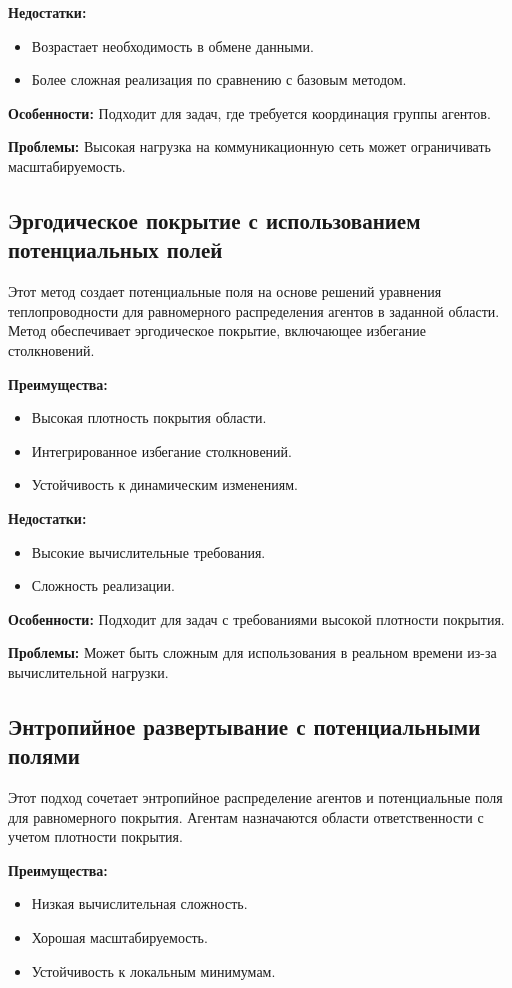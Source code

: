 \textbf{Недостатки:}
\begin{itemize}
	\item Возрастает необходимость в обмене данными.
	\item Более сложная реализация по сравнению с базовым методом.
\end{itemize}

\textbf{Особенности:} Подходит для задач, где требуется координация группы агентов.

\textbf{Проблемы:} Высокая нагрузка на коммуникационную сеть может ограничивать масштабируемость.

\subsection{Эргодическое покрытие с использованием потенциальных полей}
Этот метод создает потенциальные поля на основе решений уравнения теплопроводности для равномерного распределения агентов в заданной области. Метод обеспечивает эргодическое покрытие, включающее избегание столкновений.

\textbf{Преимущества:}
\begin{itemize}
	\item Высокая плотность покрытия области.
	\item Интегрированное избегание столкновений.
	\item Устойчивость к динамическим изменениям.
\end{itemize}

\textbf{Недостатки:}
\begin{itemize}
	\item Высокие вычислительные требования.
	\item Сложность реализации.
\end{itemize}

\textbf{Особенности:} Подходит для задач с требованиями высокой плотности покрытия.

\textbf{Проблемы:} Может быть сложным для использования в реальном времени из-за вычислительной нагрузки.

\subsection{Энтропийное развертывание с потенциальными полями}
Этот подход сочетает энтропийное распределение агентов и потенциальные поля для равномерного покрытия. Агентам назначаются области ответственности с учетом плотности покрытия.

\textbf{Преимущества:}
\begin{itemize}
	\item Низкая вычислительная сложность.
	\item Хорошая масштабируемость.
	\item Устойчивость к локальным минимумам.
\end{itemize}

